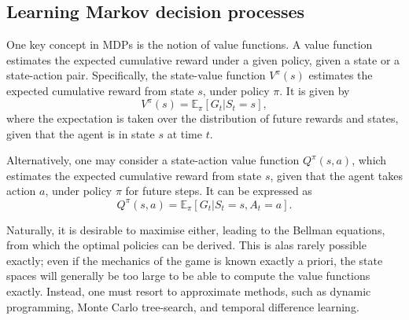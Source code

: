 \subsection{Learning Markov decision processes}
One key concept in MDPs is the notion of value functions.
A value function estimates the expected cumulative reward under a given policy, given a state or a state-action pair.
Specifically, the state-value function $V^{\pi}(s)$ estimates the expected cumulative reward from state $s$, under policy $\pi$.
It is given by
\begin{equation}
    V^{\pi}(s) = \mathbb{E}_\pi \left[ G_t | S_t = s \right],
\end{equation}
where the expectation is taken over the distribution of future rewards and states, given that the agent is in state $s$ at time $t$.

Alternatively, one may consider a state-action value function $Q^{\pi}(s, a)$, which estimates the expected cumulative reward from state $s$, given that the agent takes action $a$, under policy $\pi$ for future steps.
It can be expressed as
\begin{equation}
    Q^{\pi}(s, a) = \mathbb{E}_\pi \left[ G_t | S_t = s, A_t = a \right].
\end{equation}

Naturally, it is desirable to maximise either, leading to the Bellman equations, from which the optimal policies can be derived.
This is alas rarely possible exactly; even if the mechanics of the game is known exactly a priori\footnotemark, the state spaces will generally be too large to be able to compute the value functions exactly.
Instead, one must resort to approximate methods, such as dynamic programming, Monte Carlo tree-search, and temporal difference learning.


